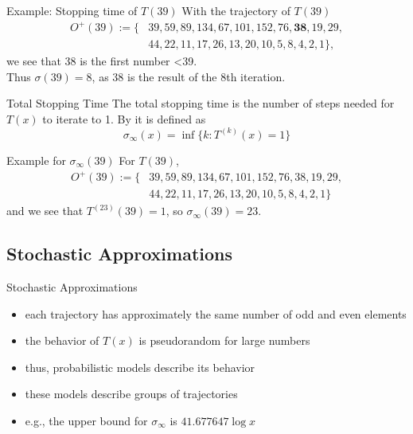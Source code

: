 \documentclass[hyperref={colorlinks,allcolors=black}]{beamer}
\begin{document}

\begin{frame}{Example: Stopping time of $T(39)$}
With the trajectory of $T(39)$
\begin{align}
    \nonumber
    O^+(39):=\{&39,59,89,134,67,101,152,76,\textbf{38},19,29,\\
    \nonumber
               &44,22,11,17,26,13,20,10,5,8,4,2,1\},
\end{align}
we see that 38 is the first number <39. \\Thus $\sigma(39) = 8$, as 38
is the result of the 8th iteration.
\end{frame}


\begin{frame}{Total Stopping Time}
The total stopping time is the number of steps needed for $T(x)$ to iterate to 
1. By \cite{src:chamberland} it is defined as
\begin{equation}
    \nonumber
    \sigma_{\infty}(x)=\inf\{k:T^{(k)}(x)=1\} 
\end{equation}
\begin{block}{Example for $\sigma_{\infty}(39)$}
For $T(39)$,
\begin{align}
    \nonumber
    O^+(39):=\{&39,59,89,134,67,101,152,76,38,19,29,\\
    \nonumber
               &44,22,11,17,26,13,20,10,5,8,4,2,1\}
\end{align}
and we see that $T^{(23)}(39)=1$, so $\sigma_{\infty}(39)=23$.
\end{block}
\end{frame}


\subsection[Approximations]{Stochastic Approximations}

\begin{frame}{Stochastic Approximations}
\begin{itemize}
    \item each trajectory has approximately the same number of odd and even 
        elements \cite{src:lagarias}
    \item the behavior of $T(x)$ is pseudorandom for large numbers 
        \cite{src:lagarias}
    \item thus, probabilistic models describe its behavior
    \item these models describe groups of trajectories \cite{src:lagarias}
    \item e.g., the upper bound for $\sigma_{\infty}$ is $41.677647 \log x$ 
        \cite{src:lagarias}
\end{itemize}
\end{frame}
\end{document}
